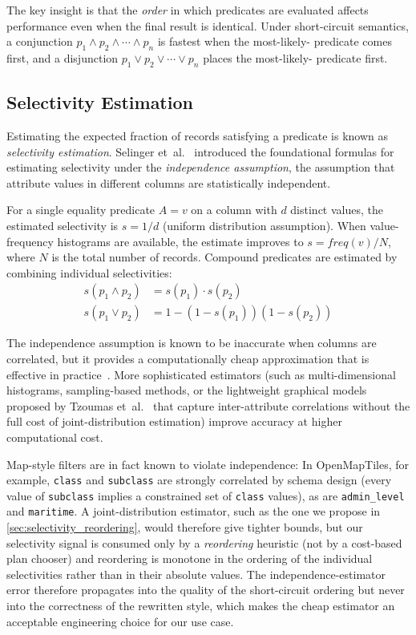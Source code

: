 The key insight is that the \emph{order} in which predicates are evaluated affects performance even when the final result is identical.
Under short-circuit semantics, a conjunction $p_1 \land p_2 \land \cdots \land p_n$ is fastest when the most-likely- predicate comes first, and a disjunction $p_1 \lor p_2 \lor \cdots \lor p_n$ places the most-likely- predicate first.

\subsection{Selectivity Estimation}

Estimating the expected fraction of records satisfying a predicate is known as \emph{selectivity estimation}.
Selinger et~al.~\cite{selingerAccessPathSelection1979} introduced the foundational formulas for estimating selectivity under the \emph{independence assumption}, the assumption that attribute values in different columns are statistically independent.

For a single equality predicate $A = v$ on a column with $d$ distinct values, the estimated selectivity is $s = 1/d$ (uniform distribution assumption).
When value-frequency histograms are available, the estimate improves to $s = \mathit{freq}(v) / N$, where $N$ is the total number of records.
Compound predicates are estimated by combining individual selectivities:
\begin{align*}\label{eq:selectivity_theory}
    s(p_1 \land p_2) &= s(p_1) \cdot s(p_2)\\
    s(p_1 \lor p_2) &= 1 - (1 - s(p_1))(1 - s(p_2))
\end{align*}

The independence assumption is known to be inaccurate when columns are correlated, but it provides a computationally cheap approximation that is effective in practice~\cite{selingerAccessPathSelection1979}.
More sophisticated estimators (such as multi-dimensional histograms, sampling-based methods, or the lightweight graphical models proposed by Tzoumas et~al.~\cite{tzoumasLightweightGraphicalModels2011} that capture inter-attribute correlations without the full cost of joint-distribution estimation) improve accuracy at higher computational cost.

Map-style filters are in fact known to violate independence:
In OpenMapTiles, for example, \texttt{class} and \texttt{subclass} are strongly correlated by schema design (every value of \texttt{subclass} implies a constrained set of \texttt{class} values), as are \texttt{admin\_level} and \texttt{maritime}.
A joint-distribution estimator, such as the one we propose in \cref{sec:selectivity_reordering}, would therefore give tighter bounds, but our selectivity signal is consumed only by a \emph{reordering} heuristic (not by a cost-based plan chooser) and reordering is monotone in the ordering of the individual selectivities rather than in their absolute values.
The independence-estimator error therefore propagates into the quality of the short-circuit ordering but never into the correctness of the rewritten style, which makes the cheap estimator an acceptable engineering choice for our use case.


